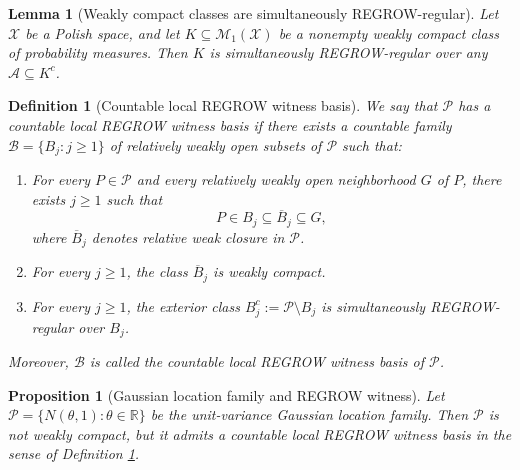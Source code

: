 \documentclass[10pt,a4paper]{amsart}
\newtheorem{lemma}{Lemma}
\newtheorem{definition}{Definition}
\newtheorem{proposition}{Proposition}
\newcommand{\calP}{\mathcal P}
\begin{document}
\begin{lemma}[Weakly compact classes are simultaneously REGROW-regular]
\label{lem:weakly-compact-regrow}
Let $\mathcal X$ be a Polish space, and let
$ K\subseteq\mathcal M_1(\mathcal X)$
be a nonempty weakly compact class of probability measures.
Then $K$ is {simultaneously REGROW-regular over any
$\mathcal A \subseteq K^c$}. 
\end{lemma}

\begin{definition}[Countable local REGROW witness basis]\label{def:witness-basis}
We say that $\calP$ has a countable local REGROW witness basis if there exists a countable family $\mathscr B=\{B_j:j\ge 1\}$ of relatively weakly open subsets of $\calP$ such that:
\begin{enumerate}[label=\textup{(\roman*)}]
\item
For every $P\in\calP$ and every relatively weakly open
neighborhood $G$ of $P$, there exists $j\ge1$ such that
\[
    P\in B_j
    \subseteq
    \overline B_j
    \subseteq
    G,
\]
where $\overline B_j$ denotes relative weak closure in $\calP$.

\item
For every $j\ge1$, the class $\overline B_j$ is weakly compact. 
\item
For every $j\ge1$, the exterior class
$B_j^c:=\calP\setminus B_j$
is simultaneously REGROW-regular over $B_j$. 
\end{enumerate}
Moreover, $\mathscr B$ is called the countable local REGROW witness basis of $\calP$.
\end{definition}

\begin{proposition}[Gaussian location family and REGROW witness]
\label{prop:gaussian-local-witness}
Let $\mathcal{P} = \{N(\theta, 1) : \theta \in \mathbb{R}\}$ be the unit-variance Gaussian location family. Then $\mathcal{P}$ is not weakly compact, but it admits a countable local REGROW witness basis in the sense of Definition \ref{def:witness-basis}.
\end{proposition}
\end{document}
